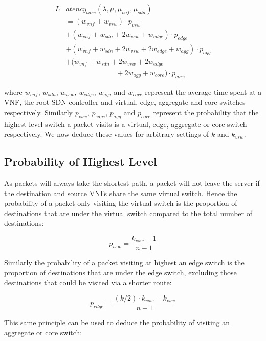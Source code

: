 \begin{equation} 
\label{eq:mean_latency}
\begin{split}
L&atency_{base}(\lambda, \mu, \mu_{vnf}, \mu_{sdn}) \\
		&=(w_{vnf} + w_{vsw}) \cdot p_{vsw} \\
		&+ (w_{vnf} + w_{sdn} + 2w_{vsw} + w_{edge}) \cdot p_{edge} \\
	 	&+ (w_{vnf} + w_{sdn} + 2w_{vsw} + 2w_{edge} + w_{agg}) \cdot p_{agg} \\
	 	&+ (w_{vnf} + w_{sdn} + 2w_{vsw} + 2w_{edge}  \\
		& \qquad\qquad\qquad\quad + 2w_{agg} + w_{core})\cdot p_{core}
\end{split}
\end{equation}

where $w_{vnf}$, $w_{sdn}$, $w_{vsw}$, $w_{edge}$, $w_{agg}$ and $w_{core}$ represent the average time spent at a VNF, the root SDN controller and virtual, edge, aggregate and core switches respectively. Similarly $p_{vsw}$, $p_{edge}$, $p_{agg}$ and $p_{core}$ represent the probability that the highest level switch a packet visits is a virtual, edge, aggregate or core switch respectively. We now deduce these values for arbitrary settings of $k$ and $k_{vsw}$.

\subsection{Probability of Highest Level}
As packets will always take the shortest path, a packet will not leave the server if the destination and source VNFs share the same virtual switch. Hence the probability of a packet only visiting the virtual switch is the proportion of destinations that are under the virtual switch compared to the total number of destinations:

\begin{equation}
\label{eq:p_vm}
p_{vsw} = \frac{k_{vsw} - 1}{n - 1}
\end{equation}

Similarly the probability of a packet visiting at highest an edge switch is the proportion of destinations that are under the edge switch, excluding those destinations that could be visited via a shorter route:

\begin{equation}
\label{eq:p_edge}
p_{edge} = \frac{(k/2) \cdot k_{vsw} - k_{vsw}}{n - 1}
\end{equation}

This same principle can be used to deduce the probability of visiting an aggregate or core switch:

